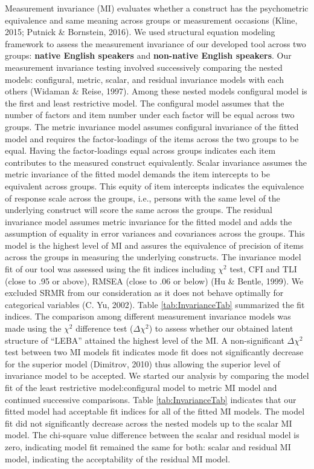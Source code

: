 \documentclass[
  english,
  man]{apa6}
\begin{document}
Measurement invariance (MI) evaluates whether a construct has the psychometric equivalence and same meaning across groups or measurement occasions (Kline, 2015; Putnick \& Bornstein, 2016). We used structural equation modeling framework to assess the measurement invariance of our developed tool across two groups: \textbf{native English speakers} and \textbf{non-native English speakers}. Our measurement invariance testing involved successively comparing the nested models: configural, metric, scalar, and residual invariance models with each others (Widaman \& Reise, 1997). Among these nested models configural model is the first and least restrictive model. The configural model assumes that the number of factors and item number under each factor will be equal across two groups. The metric invariance model assumes configural invariance of the fitted model and requires the factor-loadings of the items across the two groups to be equal. Having the factor-loadings equal across groups indicates each item contributes to the measured construct equivalently. Scalar invariance assumes the metric invariance of the fitted model demands the item intercepts to be equivalent across groups. This equity of item intercepts indicates the equivalence of response scale across the groups, i.e., persons with the same level of the underlying construct will score the same across the groups. The residual invariance model assumes metric invariance for the fitted model and adds the assumption of equality in error variances and covariances across the groups. This model is the highest level of MI and assures the equivalence of precision of items across the groups in measuring the underlying constructs.
The invariance model fit of our tool was assessed using the fit indices including \(\chi^2\) test, CFI and TLI (close to .95 or above), RMSEA (close to .06 or below) (Hu \& Bentle, 1999). We excluded SRMR from our consideration as it does not behave optimally for categorical variables (C. Yu, 2002). Table \ref{tab:InvarianceTab} summarized the fit indices. The comparison among different measurement invariance models was made using the \(\chi^2\) difference test (\(\Delta \chi^2\)) to assess whether our obtained latent structure of ``LEBA'' attained the highest level of the MI. A non-significant \(\Delta \chi^2\) test between two MI models fit indicates mode fit does not significantly decrease for the superior model (Dimitrov, 2010) thus allowing the superior level of invariance model to be accepted. We started our analysis by comparing the model fit of the least restrictive model:configural model to metric MI model and continued successive comparisons. Table \ref{tab:InvarianceTab} indicates that our fitted model had acceptable fit indices for all of the fitted MI models. The model fit did not significantly decrease across the nested models up to the scalar MI model. The chi-square value difference between the scalar and residual model is zero, indicating model fit remained the same for both: scalar and residual MI model, indicating the acceptability of the residual MI model.
\end{document}
